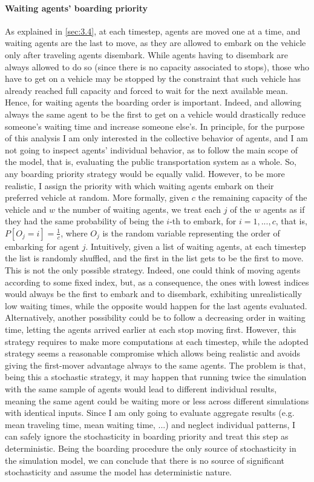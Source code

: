 \paragraph{Waiting agents' boarding priority}
As explained in \ref{sec:3.4}, at each timestep, agents are moved one at a time, and waiting agents are the last to move, as they are allowed to embark on the vehicle only after traveling agents disembark. While agents having to disembark are always allowed to do so (since there is no capacity associated to stops), those who have to get on a vehicle may be stopped by the constraint that such vehicle has already reached full capacity and forced to wait for the next available mean. Hence, for waiting agents the boarding order is important. Indeed, and allowing always the same agent to be the first to get on a vehicle would drastically reduce someone's waiting time and increase someone else's.
In principle, for the purpose of this analysis I am only interested in the collective behavior of agents, and I am not going to inspect agents' individual behavior, as to follow the main scope of the model, that is, evaluating the public transportation system as a whole. So, any boarding priority strategy would be equally valid. However, to be more realistic, I assign the priority with which waiting agents embark on their preferred vehicle at random. More formally, given $c$ the remaining capacity of the vehicle and $w$ the number of waiting agents, we treat each $j$ of the $w$ agents as if they had the same probability of being the $i$-th to embark, for $i = 1, ..., c$, that is, $P[O_j = i] = \frac{1}{c}$, where $O_j$ is the random variable representing the order of embarking for agent $j$. Intuitively, given a list of waiting agents, at each timestep the list is randomly shuffled, and the first in the list gets to be the first to move. This is not the only possible strategy. Indeed, one could think of moving agents according to some fixed index, but, as a consequence, the ones with lowest indices would always be the first to embark and to disembark, exhibiting unrealistically low waiting times, while the opposite would happen for the last agents evaluated. Alternatively, another possibility could be to follow a decreasing order in waiting time, letting the agents arrived earlier at each stop moving first. However, this strategy requires to make more computations at each timestep, while the adopted strategy seems a reasonable compromise which allows being realistic and avoids giving the first-mover advantage always to the same agents. The problem is that, being this a stochastic strategy, it may happen that running twice the simulation with the same sample of agents would lead to different individual results, meaning the same agent could be waiting more or less across different simulations with identical inputs. Since I am only going to evaluate aggregate results (e.g. mean traveling time, mean waiting time, ...) and neglect individual patterns, I can safely ignore the stochasticity in boarding priority and treat this step as deterministic. Being the boarding procedure the only source of stochasticity in the simulation model, we can conclude that there is no source of significant stochasticity and assume the model has deterministic nature.

